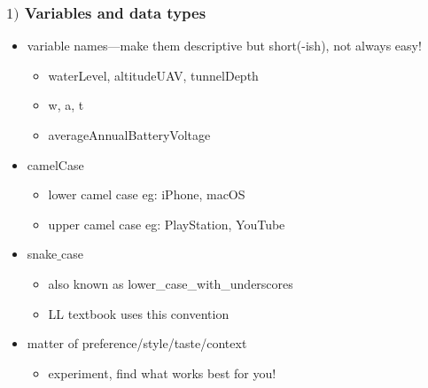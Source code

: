 \documentclass[english,14pt]{beamer}
\newcommand\red[1]{{\color{red} #1}}
\newcommand\green[1]{{\color{green} #1}}
\newcommand{\cmark}{\ding{51}}%
\newcommand{\xmark}{\ding{55}}%
\begin{document}
\begin{frame}[fragile]

\frametitle{$1)$ Variables and data types}

\begin{itemize}
	\item variable names---make them descriptive but short(-ish), not always easy!
		\begin{itemize}
			\item[\green{\cmark}]  waterLevel, altitudeUAV, tunnelDepth
			\item[\red{\xmark}] w, a, t
			\item[\red{\xmark}] averageAnnualBatteryVoltage
		\end{itemize}
	\item camelCase
		\begin{itemize}
			\item lower camel case eg: iPhone, macOS
			\item upper camel case eg: PlayStation, YouTube
		\end{itemize}
	\item snake$\_$case
		\begin{itemize}
			\item also known as lower\_case\_with\_underscores
			\item LL textbook uses this convention
		\end{itemize}
	\item matter of preference/style/taste/context
		\begin{itemize}
			\item experiment, find what works best for you! %
		\end{itemize}
\end{itemize}

\end{frame}

\end{document}
